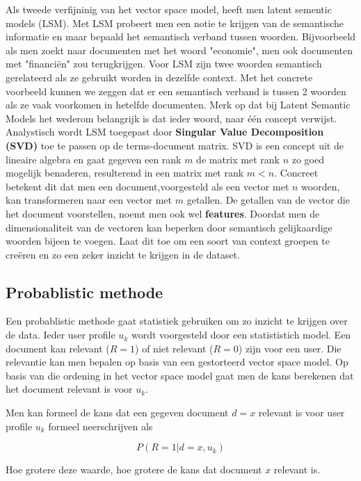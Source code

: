 Als tweede verfijninig van het vector space model, heeft men latent sementic models (LSM). Met LSM probeert men een notie te krijgen van de semantische informatie en maar bepaald het semantisch verband tussen woorden. Bijvoorbeeld als men zoekt naar documenten met het woord "economie", men ook documenten met "financi\"en" zou terugkrijgen. Voor LSM zijn twee woorden semantisch gerelateerd als ze gebruikt worden in dezelfde context. Met het concrete voorbeeld kunnen we zeggen dat er een semantisch verband is tussen 2 woorden als ze vaak voorkomen in hetelfde documenten.
\newline
Merk op dat bij Latent Semantic Models het wederom belangrijk is dat ieder woord, naar \'e\'en concept verwijst.
%
Analystisch wordt LSM toegepast door \textbf{Singular Value Decomposition (SVD)} toe te passen op de terms-document matrix. SVD is een concept uit de lineaire algebra en gaat gegeven een rank $m$ de matrix met rank $n$ zo goed mogelijk benaderen, resulterend in een matrix met rank $m<n$. Concreet betekent dit dat men een document,voorgesteld als een vector met $n$ woorden, kan transformeren naar een vector met $m$ getallen. De getallen van de vector die het document voorstellen, noemt men ook wel \textbf{features}.
%
Doordat men de dimensionaliteit van de vectoren kan beperken door semantisch gelijkaardige woorden bijeen te voegen. Laat dit toe om een soort van context groepen te cre\"eren en zo een zeker inzicht te krijgen in de dataset.
%
\subsection{Probablistic methode}\label{Probablistic methode}

Een probablistic methode gaat statistiek gebruiken om zo inzicht te krijgen over de data. Ieder user profile $u_{k}$ wordt voorgesteld door een statististich model. Een document kan relevant ($R=1$) of niet relevant ($R=0$) zijn voor een user. Die relevantie kan men bepalen op basis van een gestorteerd vector space model. Op basis van die ordening in het vector space model gaat men de kans berekenen dat het document relevant is voor $u_{k}$.

%
Men kan formeel de kans dat een gegeven document $d=x$ relevant is voor user profile $u_{k}$ formeel neerschrijven als

\[ P(R=1|d=x,u_{k}) \]

Hoe grotere deze waarde, hoe grotere de kans dat document $x$ relevant is.

